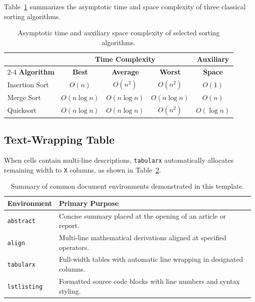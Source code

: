 \documentclass[11pt, a4paper]{article}
\theoremstyle{plain}
\theoremstyle{definition}
\theoremstyle{remark}
\begin{document}
Table~\ref{tab:complexity} summarizes the asymptotic time and space complexity of three classical sorting algorithms.

\begin{table}[htbp]
  \centering
  \caption{Asymptotic time and auxiliary space complexity of selected sorting algorithms.}
  \label{tab:complexity}
  \begin{tabular}{lcccc}
    \toprule
    & \multicolumn{3}{c}{\textbf{Time Complexity}} & \textbf{Auxiliary} \\
    \cmidrule(lr){2-4}
    \textbf{Algorithm} & \textbf{Best} & \textbf{Average} & \textbf{Worst} & \textbf{Space} \\
    \midrule
    Insertion Sort & $O(n)$ & $O(n^2)$ & $O(n^2)$ & $O(1)$ \\
    Merge Sort     & $O(n \log n)$ & $O(n \log n)$ & $O(n \log n)$ & $O(n)$ \\
    Quicksort      & $O(n \log n)$ & $O(n \log n)$ & $O(n^2)$ & $O(\log n)$ \\
    \bottomrule
  \end{tabular}
\end{table}

\subsection{Text-Wrapping Table}

When cells contain multi-line descriptions, \texttt{tabularx} automatically allocates remaining width to \texttt{X} columns, as shown in Table~\ref{tab:environments}.

\begin{table}[htbp]
  \centering
  \caption{Summary of common document environments demonstrated in this template.}
  \label{tab:environments}
  \begin{tabularx}{\textwidth}{lX}
    \toprule
    \textbf{Environment} & \textbf{Primary Purpose} \\
    \midrule
    \texttt{abstract} & Concise summary placed at the opening of an article or report. \\
    \texttt{align} & Multi-line mathematical derivations aligned at specified operators. \\
    \texttt{tabularx} & Full-width tables with automatic line wrapping in designated columns. \\
    \texttt{lstlisting} & Formatted source code blocks with line numbers and syntax styling. \\
    \bottomrule
  \end{tabularx}
\end{table}
\end{document}
